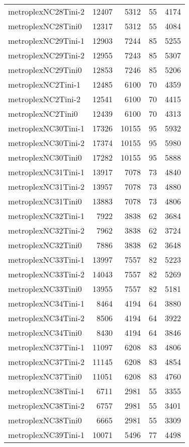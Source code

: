 \begin{longtable}{lrrrr}
metroplexNC28Tini-2 & 12407 & 5312 & 55 & 4174 \\
metroplexNC28Tini0 & 12317 & 5312 & 55 & 4084 \\
metroplexNC29Tini-1 & 12903 & 7244 & 85 & 5255 \\
metroplexNC29Tini-2 & 12955 & 7243 & 85 & 5307 \\
metroplexNC29Tini0 & 12853 & 7246 & 85 & 5206 \\
metroplexNC2Tini-1 & 12485 & 6100 & 70 & 4359 \\
metroplexNC2Tini-2 & 12541 & 6100 & 70 & 4415 \\
metroplexNC2Tini0 & 12439 & 6100 & 70 & 4313 \\
metroplexNC30Tini-1 & 17326 & 10155 & 95 & 5932 \\
metroplexNC30Tini-2 & 17374 & 10155 & 95 & 5980 \\
metroplexNC30Tini0 & 17282 & 10155 & 95 & 5888 \\
metroplexNC31Tini-1 & 13917 & 7078 & 73 & 4840 \\
metroplexNC31Tini-2 & 13957 & 7078 & 73 & 4880 \\
metroplexNC31Tini0 & 13883 & 7078 & 73 & 4806 \\
metroplexNC32Tini-1 & 7922 & 3838 & 62 & 3684 \\
metroplexNC32Tini-2 & 7962 & 3838 & 62 & 3724 \\
metroplexNC32Tini0 & 7886 & 3838 & 62 & 3648 \\
metroplexNC33Tini-1 & 13997 & 7557 & 82 & 5223 \\
metroplexNC33Tini-2 & 14043 & 7557 & 82 & 5269 \\
metroplexNC33Tini0 & 13955 & 7557 & 82 & 5181 \\
metroplexNC34Tini-1 & 8464 & 4194 & 64 & 3880 \\
metroplexNC34Tini-2 & 8506 & 4194 & 64 & 3922 \\
metroplexNC34Tini0 & 8430 & 4194 & 64 & 3846 \\
metroplexNC37Tini-1 & 11097 & 6208 & 83 & 4806 \\
metroplexNC37Tini-2 & 11145 & 6208 & 83 & 4854 \\
metroplexNC37Tini0 & 11051 & 6208 & 83 & 4760 \\
metroplexNC38Tini-1 & 6711 & 2981 & 55 & 3355 \\
metroplexNC38Tini-2 & 6757 & 2981 & 55 & 3401 \\
metroplexNC38Tini0 & 6665 & 2981 & 55 & 3309 \\
metroplexNC39Tini-1 & 10071 & 5496 & 77 & 4498 \\

\end{longtable}
